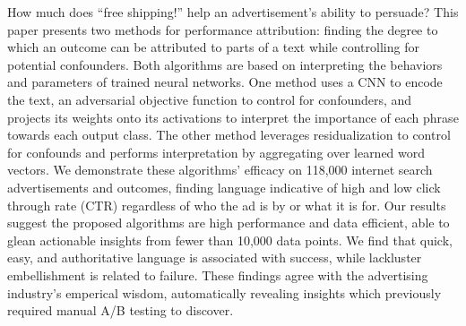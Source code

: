 How much does ``free shipping!'' help an advertisement's ability to persuade? This paper presents two methods for performance attribution: finding the degree to which an outcome can be attributed to parts of a text while controlling for potential confounders. Both algorithms are based on interpreting the behaviors and parameters of trained neural networks. One method uses a CNN to encode the text, an adversarial objective function to control for confounders, and projects its weights onto its activations to interpret the importance of each phrase towards each output class. The other method leverages residualization to control for confounds and performs interpretation by aggregating over learned word vectors. We demonstrate these algorithms' efficacy on 118,000 internet search advertisements and outcomes, finding language indicative of high and low click through rate (CTR) regardless of who the ad is by or what it is for. Our results suggest the proposed algorithms are high performance and data efficient, able to glean actionable insights from fewer than 10,000 data points. We find that quick, easy, and authoritative language is associated with success, while lackluster embellishment is related to failure. These findings agree with the advertising industry's emperical wisdom, automatically revealing insights which previously required manual A/B testing to discover.
